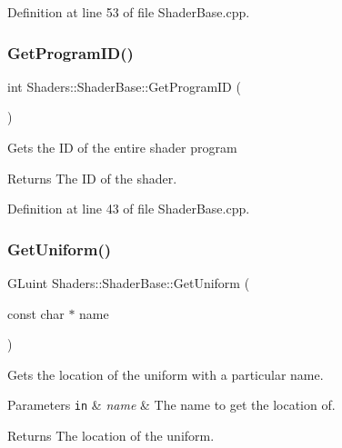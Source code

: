 Definition at line 53 of file Shader\+Base.\+cpp.

\mbox{\label{class_shaders_1_1_shader_base_a77870f40caecabf2acbae1eafd38f4c5}} 
\subsubsection{\texorpdfstring{Get\+Program\+I\+D()}{GetProgramID()}}
{\footnotesize\ttfamily int Shaders\+::\+Shader\+Base\+::\+Get\+Program\+ID (\begin{DoxyParamCaption}{ }\end{DoxyParamCaption})}

Gets the ID of the entire shader program \begin{DoxyReturn}{Returns}
The ID of the shader. 
\end{DoxyReturn}


Definition at line 43 of file Shader\+Base.\+cpp.

\mbox{\label{class_shaders_1_1_shader_base_ae3fa1c430786dccf85b86e0337fa7f02}} 
\subsubsection{\texorpdfstring{Get\+Uniform()}{GetUniform()}}
{\footnotesize\ttfamily G\+Luint Shaders\+::\+Shader\+Base\+::\+Get\+Uniform (\begin{DoxyParamCaption}\item[{const char $\ast$}]{name }\end{DoxyParamCaption})\hspace{0.3cm}{\ttfamily [protected]}}

Gets the location of the uniform with a particular name. 
\begin{DoxyParams}[1]{Parameters}
\mbox{\tt in}  & {\em name} & The name to get the location of. \\
\hline
\end{DoxyParams}
\begin{DoxyReturn}{Returns}
The location of the uniform. 
\end{DoxyReturn}


